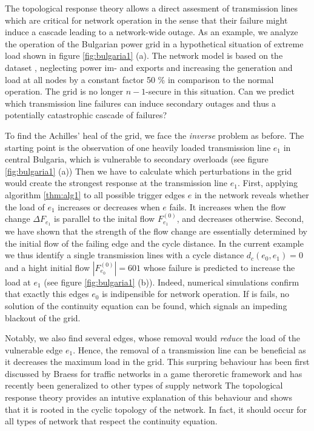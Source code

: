 \documentclass[10pt,aps,pra,twocolumn,superscriptaddress]{revtex4-1}
\begin{document}
The topological response theory allows a direct assesment of transmission lines which are
critical for network operation in the sense that their failure might induce a cascade leading
to a network-wide outage. As an example, we analyze the operation of the Bulgarian power grid 
in a hypothetical situation of extreme load shown in figure \ref{fig:bulgaria1} (a). The network 
model is based on the dataset \cite{Hutc13}, neglecting power im- and exports and increasing 
the generation and load at all nodes by a constant factor 50 \% in comparison to the normal operation.
The grid is no longer $n-1$-secure in this situation.  Can we predict which transmission line
failures can induce secondary outages and thus a potentially catastrophic cascade of failures?

To find the Achilles' heal of the grid, we face the \emph{inverse} problem as before. 
The starting point is the observation of one heavily loaded transmission line 
$e_1$ in central Bulgaria, which is vulnerable to secondary overloads
(see figure \ref{fig:bulgaria1} (a))
Then we have to calculate which perturbations in the grid would create the strongest response 
at the transmission line $e_1$.  
First, applying algorithm \ref{thm:alg1} to all possible trigger edges $e$ in the network 
reveals whether the load of $e_1$ increases or decreases when $e$ fails. It increases
when the flow change $\Delta F_{e_1}$ is parallel to the inital flow $F_{e_1}^{(0)}$,
and decreases otherwise.
Second, we have shown that the strength of the flow change are essentially determined by the 
initial flow of the failing edge and the cycle distance. In the current example we thus identify 
a single transmission lines with a cycle distance $d_c(e_0,e_1)=0$ and a hight initial flow
$|F_{e_0}^{(0)}| = 601$ whose failure is predicted to increase the load at $e_1$ 
(see figure \ref{fig:bulgaria1} (b)). Indeed, numerical simulations confirm that exactly this 
edges $e_0$ is indipensible for network operation. If is fails, no solution of the continuity 
equation can be found, which signals an impeding blackout of the grid. 

Notably, we also find several edges, whose removal would \emph{reduce} the load of the vulnerable
edge $e_1$. Hence, the removal of a transmission line can be beneficial as it decreases the 
maximum load in the grid. This surpring behaviour has been first discussed by Braess for
traffic networks in a game theroretic framework \cite{Brae68} and has recently been 
generalized to other types of supply network \cite{Mott04,12braess,13nonlocal}  
The topological response theory provides an intutive explanation of this behaviour
and shows that it is rooted in the cyclic topology of the network. In fact, it should
occur for all types of network that respect the continuity equation.
  
\end{document}
